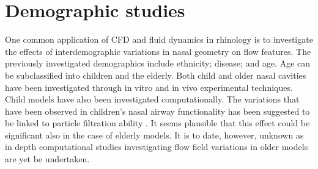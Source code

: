 %
%
%
%
%
%
%
%
%
%
%
%
%
%
%
%
%
%



\section{Demographic studies}
One common application of CFD and fluid dynamics in rhinology is to investigate the effects of interdemographic variations in nasal geometry on flow features. The previously investigated demographics include ethnicity\cite{Zhu2011}; disease\cite{Garcia2007}; and  age\cite{Xi2012}. Age can be subclassified into children\cite{Xi2012} and the elderly\cite{Lindemann2008}. Both child and older nasal cavities have been investigated through in vitro\cite{Weinhold2004} and in vivo\cite{Kalmovich2005, Edelstein1996, WhanKim2007, Lindemann2008} experimental techniques. Child models have also been investigated computationally\cite{Xi2012}. The variations that have been observed in children's nasal airway functionality has been suggested to be linked to particle filtration ability \cite{Xi2012}. It seems plausible that this effect could be significant also in the case of elderly models. It is to date, however, unknown as in depth computational studies investigating flow field variations in older models are yet be undertaken.


